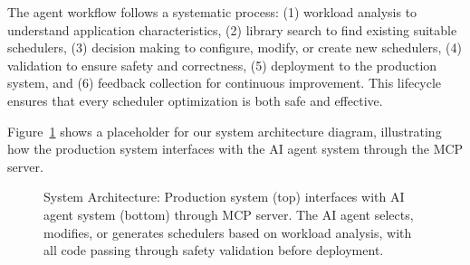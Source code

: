 The agent workflow follows a systematic process: (1) workload analysis to understand application characteristics, (2) library search to find existing suitable schedulers, (3) decision making to configure, modify, or create new schedulers, (4) validation to ensure safety and correctness, (5) deployment to the production system, and (6) feedback collection for continuous improvement. This lifecycle ensures that every scheduler optimization is both safe and effective.

Figure~\ref{fig:architecture} shows a placeholder for our system architecture diagram, illustrating how the production system interfaces with the AI agent system through the MCP server.

\begin{figure}[h]
\centering
{}
\caption{System Architecture: Production system (top) interfaces with AI agent system (bottom) through MCP server. The AI agent selects, modifies, or generates schedulers based on workload analysis, with all code passing through safety validation before deployment.}
\label{fig:architecture}
\end{figure}